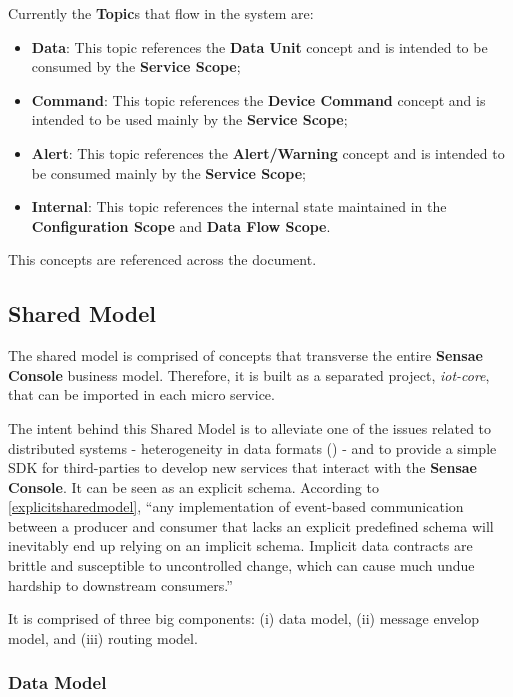 Currently the \textbf{Topic}s that flow in the system are:

\begin{itemize}
   \item \textbf{Data}: This topic references the \textbf{Data Unit} concept and is intended to be consumed by the \textbf{Service Scope};
   \item \textbf{Command}: This topic references the \textbf{Device Command} concept and is intended to be used mainly by the \textbf{Service Scope};
   \item \textbf{Alert}: This topic references the \textbf{Alert/Warning} concept and is intended to be consumed mainly by the \textbf{Service Scope};
   \item \textbf{Internal}: This topic references the internal state maintained in the \textbf{Configuration Scope} and \textbf{Data Flow Scope}.
\end{itemize}

This concepts are referenced across the document.

\subsection{Shared Model}
\label{subsec:design:domain:shared_model}

The shared model is comprised of concepts that transverse the entire \textbf{Sensae Console} business model. Therefore, it is built as a separated project, \textit{iot-core}, that can be imported in each micro service.

The intent behind this Shared Model is to alleviate one of the issues related to distributed systems - heterogeneity in data formats (\cite{nadiminti2006distributed}) - and to provide a simple \gls{SDK} for third-parties to develop new services that interact with the \textbf{Sensae Console}. It can be seen as an explicit schema. According to \ref{explicitsharedmodel}, ``any implementation of event-based communication between a producer and consumer that lacks an explicit predefined schema will inevitably end up relying on an implicit schema. Implicit data contracts are brittle and susceptible to uncontrolled change, which can cause much undue hardship to downstream consumers.''

It is comprised of three big components: (i) data model, (ii) message envelop model, and (iii) routing model.

\subsubsection*{Data Model}
\label{subsubsec:design:domain:shared_model:data}

